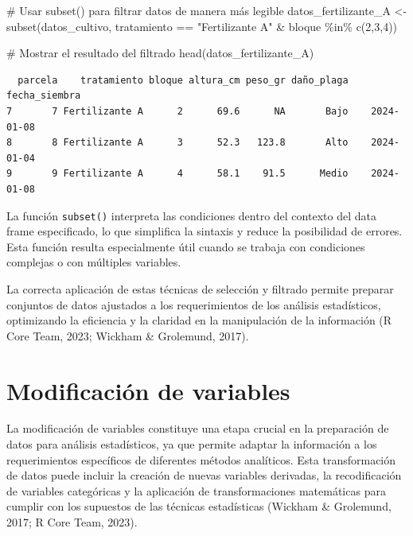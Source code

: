 \documentclass[
  spanish,
  a4paper,
  DIV=11,
  numbers=noendperiod,
  onepage,
  openany]{scrreprt}
\newenvironment{Shaded}{\begin{snugshade}}{\end{snugshade}}
\newcommand{\CommentTok}[1]{\textcolor[rgb]{0.37,0.37,0.37}{#1}}
\newcommand{\DecValTok}[1]{\textcolor[rgb]{0.68,0.00,0.00}{#1}}
\newcommand{\FunctionTok}[1]{\textcolor[rgb]{0.28,0.35,0.67}{#1}}
\newcommand{\NormalTok}[1]{\textcolor[rgb]{0.00,0.23,0.31}{#1}}
\newcommand{\OtherTok}[1]{\textcolor[rgb]{0.00,0.23,0.31}{#1}}
\newcommand{\SpecialCharTok}[1]{\textcolor[rgb]{0.37,0.37,0.37}{#1}}
\newcommand{\StringTok}[1]{\textcolor[rgb]{0.13,0.47,0.30}{#1}}
\begin{document}
\begin{Shaded}
\begin{Highlighting}[]
\CommentTok{\# Usar subset() para filtrar datos de manera más legible}
\NormalTok{datos\_fertilizante\_A }\OtherTok{\textless{}{-}} \FunctionTok{subset}\NormalTok{(datos\_cultivo, }
\NormalTok{                              tratamiento }\SpecialCharTok{==} \StringTok{"Fertilizante A"} \SpecialCharTok{\&}
\NormalTok{                              bloque }\SpecialCharTok{\%in\%} \FunctionTok{c}\NormalTok{(}\DecValTok{2}\NormalTok{,}\DecValTok{3}\NormalTok{,}\DecValTok{4}\NormalTok{))}

\CommentTok{\# Mostrar el resultado del filtrado}
\FunctionTok{head}\NormalTok{(datos\_fertilizante\_A)}
\end{Highlighting}
\end{Shaded}

\begin{verbatim}
  parcela    tratamiento bloque altura_cm peso_gr daño_plaga fecha_siembra
7       7 Fertilizante A      2      69.6      NA       Bajo    2024-01-08
8       8 Fertilizante A      3      52.3   123.8       Alto    2024-01-04
9       9 Fertilizante A      4      58.1    91.5      Medio    2024-01-08
\end{verbatim}

La función \texttt{subset()} interpreta las condiciones dentro del
contexto del data frame especificado, lo que simplifica la sintaxis y
reduce la posibilidad de errores. Esta función resulta especialmente
útil cuando se trabaja con condiciones complejas o con múltiples
variables.

La correcta aplicación de estas técnicas de selección y filtrado permite
preparar conjuntos de datos ajustados a los requerimientos de los
análisis estadísticos, optimizando la eficiencia y la claridad en la
manipulación de la información (R Core Team, 2023; Wickham \& Grolemund,
2017).

\section{Modificación de variables}\label{modificaciuxf3n-de-variables}

La modificación de variables constituye una etapa crucial en la
preparación de datos para análisis estadísticos, ya que permite adaptar
la información a los requerimientos específicos de diferentes métodos
analíticos. Esta transformación de datos puede incluir la creación de
nuevas variables derivadas, la recodificación de variables categóricas y
la aplicación de transformaciones matemáticas para cumplir con los
supuestos de las técnicas estadísticas (Wickham \& Grolemund, 2017; R
Core Team, 2023).
\end{document}
